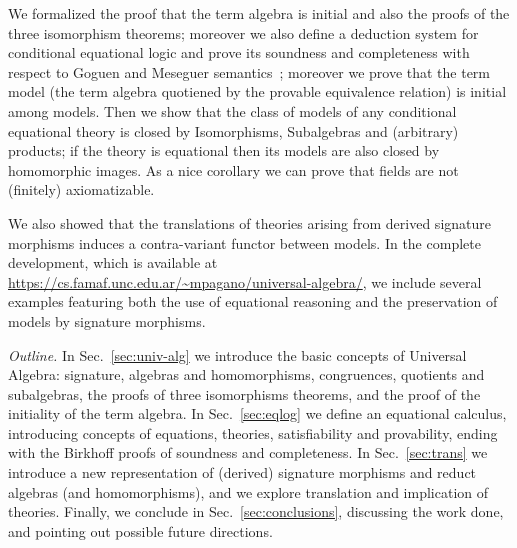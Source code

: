 We formalized the proof that the term algebra is initial and also the
proofs of the three isomorphism theorems; moreover we also define a
deduction system for conditional equational logic and prove its
soundness and completeness with respect to Goguen and Meseguer
semantics~\citeyearpar{GoguenM82}; moreover we prove that the term model (the
term algebra quotiened by the provable equivalence relation) is
initial among models. Then we show that the class of models of any
conditional equational theory is closed by Isomorphisms, Subalgebras
and (arbitrary) products; if the theory is equational then its models
are also closed by homomorphic images. As a nice corollary we can
prove that fields are not (finitely) axiomatizable.

We also showed that the translations of theories arising from derived
signature morphisms induces a contra-variant functor between models.
In the complete development, which is available at
\url{https://cs.famaf.unc.edu.ar/~mpagano/universal-algebra/}, we
include several examples featuring both the use of equational
reasoning and the preservation of models by signature morphisms.

\textit{Outline.} In Sec.~\ref{sec:univ-alg} we introduce the basic
concepts of Universal Algebra: signature, algebras and homomorphisms,
congruences, quotients and subalgebras, the proofs of three
isomorphisms theorems, and the proof of the initiality of the term
algebra.  In Sec.~\ref{sec:eqlog} we define an equational calculus, introducing
concepts of equations, theories, satisfiability and provability,
ending with the Birkhoff proofs of soundness and completeness.  In
Sec.~\ref{sec:trans} we introduce a new representation of (derived) signature
morphisms and reduct algebras (and homomorphisms), and we explore
translation and implication of theories.
Finally, we conclude in Sec.~\ref{sec:conclusions}, discussing the
work done, and pointing out possible future directions.

